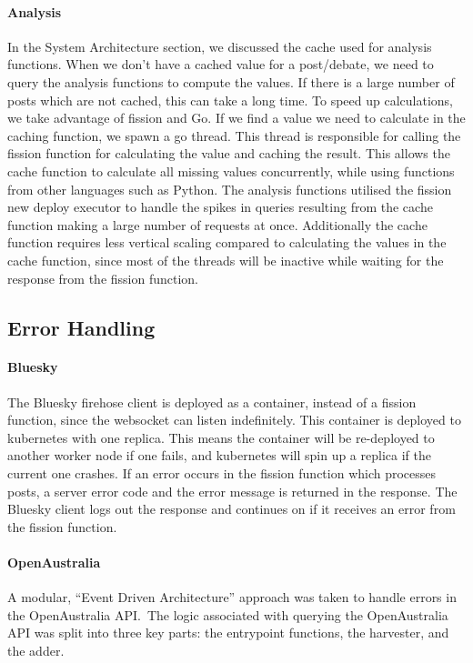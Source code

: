 \documentclass[]{article}
\numberwithin{equation}{section}
\begin{document}
\paragraph*{Analysis} In the System Architecture section, we discussed the cache used for analysis functions.
When we don't have a cached value for a post/debate, we need to query the analysis functions to compute the values.
If there is a large number of posts which are not cached, this can take a long time.
To speed up calculations, we take advantage of fission and Go.
If we find a value we need to calculate in the caching function, we spawn a go thread.
This thread is responsible for calling the fission function for calculating the value and caching the result.
This allows the cache function to calculate all missing values concurrently, while using functions from other languages such as Python.
The analysis functions utilised the fission new deploy executor to handle the spikes in queries resulting from the cache function making a large number of requests at once.
Additionally the cache function requires less vertical scaling compared to calculating the values in the cache function, since most of the threads will be inactive while waiting for the response from the fission function.

\subsection*{Error Handling}

\paragraph*{Bluesky} The Bluesky firehose client is deployed as a container, instead of a fission function, since the websocket can listen indefinitely.
This container is deployed to kubernetes with one replica. 
This means the container will be re-deployed to another worker node if one fails, and kubernetes will spin up a replica if the current one crashes.
If an error occurs in the fission function which processes posts, a server error code and the error message is returned in the response.
The Bluesky client logs out the response and continues on if it receives an error from the fission function.

\paragraph*{OpenAustralia} 
A modular, ``Event Driven Architecture'' approach was taken to handle errors in the OpenAustralia API.\ 
The logic associated with querying the OpenAustralia API was split into three key parts: the entrypoint functions, the harvester, and the adder.
\end{document}
